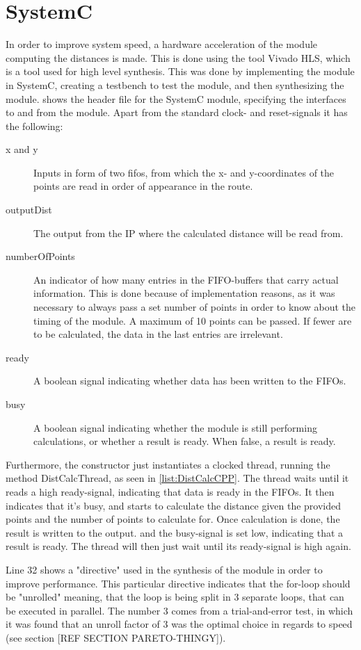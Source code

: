 \section{SystemC}
In order to improve system speed, a hardware acceleration of the module computing the distances is made. This is done using the tool Vivado HLS, which is a tool used for high level synthesis. This was done by implementing the module in SystemC, creating a testbench to test the module, and then synthesizing the module.  shows the header file for the SystemC module, specifying the interfaces to and from the module. Apart from the standard clock- and reset-signals it has the following:

\begin{description}
	\item[x and y] Inputs in form of two fifos, from which the x- and y-coordinates of the points are read in order of appearance in the route.
	\item[outputDist] The output from the IP where the calculated distance will be read from.
	\item[numberOfPoints] An indicator of how many entries in the FIFO-buffers that carry actual information. This is done because of implementation reasons, as it was necessary to always pass a set number of points in order to know about the timing of the module. A maximum of 10 points can be passed. If fewer are to be calculated, the data in the last entries are irrelevant.	
	\item [ready] A boolean signal indicating whether data has been written to the FIFOs.
	\item [busy] A boolean signal indicating whether the module is still performing calculations, or whether a result is ready. When false, a result is ready.
\end{description}
Furthermore, the constructor just instantiates a clocked thread, running the method DistCalcThread, as seen in \cref{list:DistCalcCPP}. The thread waits until it reads a high ready-signal, indicating that data is ready in the FIFOs. It then indicates that it's busy, and starts to calculate the distance given the provided points and the number of points to calculate for. Once calculation is done, the result is written to the output. and the busy-signal is set low, indicating that a result is ready. The thread will then just wait until its ready-signal is high again.

Line 32 shows a "directive" used in the synthesis of the module in order to improve performance. This particular directive indicates that the for-loop should be "unrolled" meaning, that the loop is being split in 3 separate loops, that can be executed in parallel. The number 3 comes from a trial-and-error test, in which it was found that an unroll factor of 3 was the optimal choice in regards to speed (see section [REF SECTION PARETO-THINGY]).

